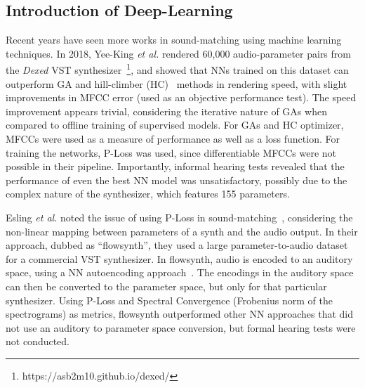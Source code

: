 \documentclass[lettersize,journal]{IEEEtran}
\providecommand{\gls}[1]{#1}
\begin{document}
\subsection{Introduction of Deep-Learning}
Recent years have seen more works in sound-matching using machine learning techniques. In 2018, Yee-King \textit{et al.} rendered 60,000 audio-parameter pairs from the \textit{Dexed} \gls{VST} synthesizer~\footnote{https://asb2m10.github.io/dexed/}, and showed that NNs trained on this dataset can outperform GA and hill-climber (\gls{HC})~\cite{hoffmann2000heuristic} methods in rendering speed, with slight improvements in MFCC error (used as an objective performance test). The speed improvement appears trivial, considering the iterative nature of GAs when compared to offline training of supervised models. For GAs and HC optimizer, MFCCs were used as a measure of performance as well as a loss function. For training the networks, P-Loss was used, since differentiable MFCCs were not possible in their pipeline. Importantly, informal hearing tests revealed that the performance of even the best NN model was unsatisfactory, possibly due to the complex nature of the synthesizer, which features 155 parameters.



Esling \textit{et al.} noted the issue of using P-Loss in sound-matching~\cite{esling2019flow}, considering the non-linear mapping between parameters of a synth and the audio output. In their approach, dubbed as ``flowsynth'', they used a large parameter-to-audio dataset for a commercial \gls{VST} synthesizer. In flowsynth, audio is encoded to an auditory space, using a NN autoencoding approach~\cite{hinton2006reducing}. The encodings in the auditory space can then be converted to the parameter space, but only for that particular synthesizer. Using P-Loss and Spectral Convergence (Frobenius norm of the spectrograms) as metrics, flowsynth outperformed other NN approaches that did not use an auditory to parameter space conversion, but formal hearing tests were not conducted.
\end{document}
